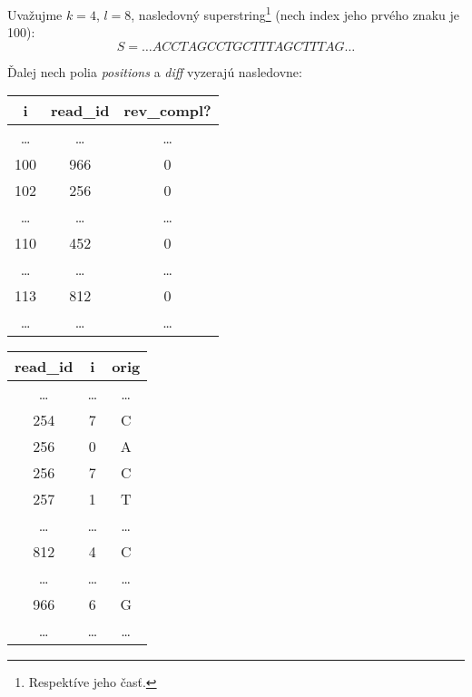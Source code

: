 \begin{example}
Uvažujme $k=4$, $l=8$, nasledovný superstring\footnote{Respektíve jeho časť.} (nech index jeho prvého znaku je 100):
$$S=\ldots ACCTAGCCTGCTTTAGCTTTAG \ldots$$

Ďalej nech polia \emph{positions} a \emph{diff} vyzerajú nasledovne:

\begin{minipage}[t]{0.45\linewidth}
    \vspace{0pt}
    \begin{tabular}{ | c | c | c | }
        \hline
        \textbf{i} & \textbf{read\_id} & \textbf{rev\_compl?} \\ \hline
        \ldots & \ldots & \ldots \\ \hline
        100    & 966    &  0     \\ \hline
        102    & 256    &  0     \\ \hline
        \ldots & \ldots & \ldots \\ \hline   
        110    & 452    &  0     \\ \hline
        \ldots & \ldots & \ldots \\ \hline   
        113    & 812    &  0     \\ \hline 
        \ldots & \ldots & \ldots \\ \hline
    \end{tabular}
\end{minipage}
\hspace{0.5cm}
\begin{minipage}[t]{0.45\linewidth}
    \vspace{0pt}
    \begin{tabular}{ | c | c | c | }
        \hline
        \textbf{read\_id} & \textbf{i} & \textbf{orig} \\ \hline
        \ldots & \ldots & \ldots \\ \hline        
        254  & 7 & C \\ \hline
        256  & 0 & A \\ \hline
        256  & 7 & C \\ \hline
        257  & 1 & T \\ \hline
        \ldots  & \ldots & \ldots \\ \hline
        812  & 4 & C \\ \hline
        \ldots  & \ldots & \ldots \\ \hline
        966  & 6 & G \\ \hline
        \ldots & \ldots & \ldots \\ \hline
    \end{tabular}
\end{minipage}
\bigskip
\bigskip


\end{example}
